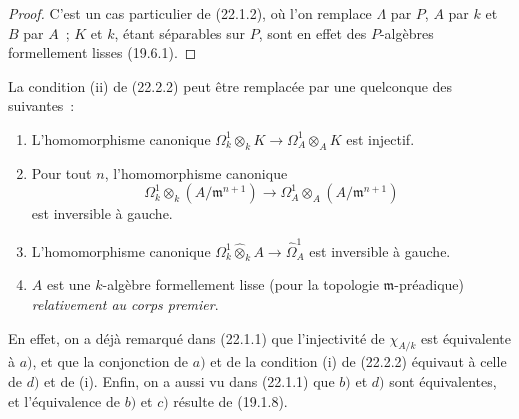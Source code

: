 \begin{proof}
C'est un cas particulier de (22.1.2), où l'on remplace $\Lambda$ par $P$,
$A$ par $k$ et $B$ par $A$~; $K$ et $k$, étant séparables sur $P$, sont en
effet des $P$-algèbres formellement lisses (19.6.1).
\end{proof}

\begin{remark}[22.2.3]
\label{0.22.2.3-fr}
La condition (ii) de (22.2.2) peut être remplacée par une quelconque des
suivantes~:
\begin{enumerate}
  \item[a)] L'homomorphisme canonique
  $\Omega^1_k\otimes_kK\to\Omega^1_A\otimes_AK$ est injectif.
  \item[b)] Pour tout $n$, l'homomorphisme canonique
  \[
    \Omega^1_k\otimes_k(A/\mathfrak m^{n+1})
    \longrightarrow
    \Omega^1_A\otimes_A(A/\mathfrak m^{n+1})
  \]
  est inversible à gauche.
  \item[c)] L'homomorphisme canonique
  $\Omega^1_k\widehat\otimes_kA\to\widehat\Omega^1_A$ est inversible à
  gauche.
  \item[d)] $A$ est une $k$-algèbre formellement lisse (pour la topologie
  $\mathfrak m$-préadique) \emph{relativement au corps premier}.
\end{enumerate}
En effet, on a déjà remarqué dans (22.1.1) que l'injectivité de $\chi_{A/k}$
est équivalente à $a)$, et que la conjonction de $a)$ et de la condition (i)
de (22.2.2) équivaut à celle de $d)$ et de (i). Enfin, on a aussi vu dans
(22.1.1) que $b)$ et $d)$ sont équivalentes, et l'équivalence de $b)$ et
$c)$ résulte de (19.1.8).
\end{remark}
